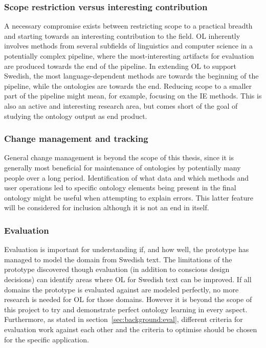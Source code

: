 \documentclass[a4paper]{report}
\newcommand{\todo}[1]{}
\begin{document}
\todo{Perhaps add specifically that the prototyp should do terms=concepts, taxonomic and nontaxonomic relations, and actually build an OWL ontology. I find the OWL ontology part important since it's really a sneaky thing to leave out and say you're making ontologies a la OntoGain - do you assume relation equivalence?}

\subsubsection{Scope restriction versus interesting contribution}

A necessary compromise exists between restricting scope to a practical breadth and starting towards an interesting contribution to the field.
OL inherently involves methods from several subfields of linguistics and computer science in a potentially complex pipeline, where the most-interesting artifacts for evaluation are produced towards the end of the pipeline.
In extending OL to support Swedish, the most language-dependent methods are towards the beginning of the pipeline, while the ontologies are towards the end.
Reducing scope to a smaller part of the pipeline might mean, for example, focusing on the IE methods.
This is also an active and interesting research area, but comes short of the goal of studying the ontology output as end product.

\subsubsection{Change management and tracking}

General change management is beyond the scope of this thesis, since it is generally most beneficial for maintenance of ontologies by potentially many people over a long period.
Identification of what data and which methods and user operations led to specific ontology elements being present in the final ontology might be useful when attempting to explain errors.
This latter feature will be considered for inclusion although it is not an end in itself.

\subsubsection{Evaluation}

Evaluation is important for understanding if, and how well, the prototype has managed to model the domain from Swedish text.
The limitations of the prototype discovered though evaluation (in addition to conscious design decisions) can identify areas where OL for Swedish text can be improved.
If all domains the prototype is evaluated against are modeled perfectly, no more research is needed for OL for those domains.
However it is beyond the scope of this project to try and demonstrate perfect ontology learning in every aspect.
Furthermore, as stated in section~\ref{sec:background:eval}, different criteria for evaluation work against each other and the criteria to optimise should be chosen for the specific application.
\end{document}
